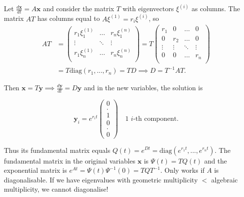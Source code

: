 \documentclass[10pt,landscape]{article}
\begin{document}
\begin{multicols}{2}
\begin{itemize}
    
Let $\frac{d\mathbf{x}}{dt} = A\mathbf{x}$ and consider the matrix $T$ with eigenvectors $\xi^{(i)}$ as columns. The matrix $AT$ has columns equal to $A\xi^{(1)} = r_i\xi^{(i)}$, so \\
  \begin{align*}
  AT &= \begin{pmatrix} 
       r_1 \xi_1^{(1)}    & \dots &  r_n\xi_1^{(n)}   \\
      \vdots   & \ddots   &  \vdots \\
      r_1 \xi_n^{(1)}    & \dots & r_n \xi_n^{(n)}  \\
  \end{pmatrix} 
  = T \begin{pmatrix} 
        r_1  & 0& \dots &  0 \\
      	0 &  r_2 & \dots    & 0 \\
     	\vdots & \vdots & \ddots & \vdots \\
     	0 & 0 & \dots &r_n \\
  	\end{pmatrix} \\ &= T \text{diag}(r_1,...,r_n) = TD \implies D = T^{-1}AT .
  \end{align*}
  
Then $\mathbf{x} = T\mathbf{y} \implies \frac{d\mathbf{y}}{dt} = D\mathbf{y}$ and in the new variables, the solution is\\
\vspace{0.05cm}

$$\mathbf{y}_i = e^{r_it} \begin{pmatrix} 0 \\  . \\ 1 \\ 0 \\ . \\0 \end{pmatrix} \quad \text{1 $i$-th component.}$$

Thus its fundamental matrix equals $Q(t) = e^{Dt} = \text{diag}(e^{r_1t},...,e^{r_nt})$. 
The fundamental matrix in the original variables $\mathbf{x}$ is $\Psi(t) = TQ(t)$ and the exponential matrix is $e^{At} = \Psi(t)\Psi^{-1}(0) = TQT^{-1}$. Only works if $A$ is diagonalisable. If we have eigenvalues with geometric multiplicity $<$ algebraic multiplicity, we cannot diagonalise!


\end{itemize}
\end{multicols}
\end{document}

